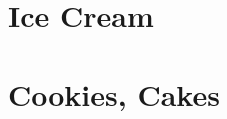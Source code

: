 \chapter{Ice Cream}
\clearpage




\chapter{Cookies, Cakes}
\clearpage




%
%
%
%
%
%

\clearpage
{}
\printbibliography


